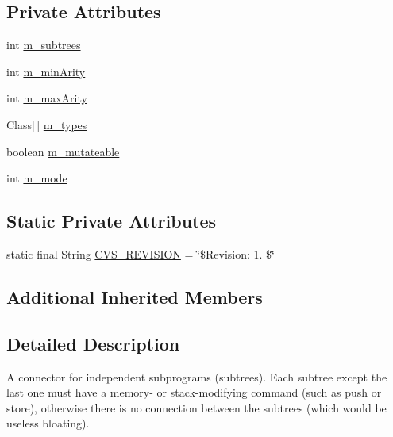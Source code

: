\subsection*{Private Attributes}
\begin{DoxyCompactItemize}
\item 
int \hyperlink{classorg_1_1jgap_1_1gp_1_1function_1_1_sub_program_a9593900f6e735a80870297491f38d5bf}{m\-\_\-subtrees}
\item 
int \hyperlink{classorg_1_1jgap_1_1gp_1_1function_1_1_sub_program_a414de40b13a4a090fc405e6ccf8a5d34}{m\-\_\-min\-Arity}
\item 
int \hyperlink{classorg_1_1jgap_1_1gp_1_1function_1_1_sub_program_a6751e1fc9048b69669880c52719c1312}{m\-\_\-max\-Arity}
\item 
Class\mbox{[}$\,$\mbox{]} \hyperlink{classorg_1_1jgap_1_1gp_1_1function_1_1_sub_program_af75004f996cfb4a825cc701c61047777}{m\-\_\-types}
\item 
boolean \hyperlink{classorg_1_1jgap_1_1gp_1_1function_1_1_sub_program_a9af15731317fff5d51db159ceea8bdb9}{m\-\_\-mutateable}
\item 
int \hyperlink{classorg_1_1jgap_1_1gp_1_1function_1_1_sub_program_ae91718b5521998e6467111bc33de873f}{m\-\_\-mode}
\end{DoxyCompactItemize}
\subsection*{Static Private Attributes}
\begin{DoxyCompactItemize}
\item 
static final String \hyperlink{classorg_1_1jgap_1_1gp_1_1function_1_1_sub_program_a7324753f18015392cd7c107e4e23ce98}{C\-V\-S\-\_\-\-R\-E\-V\-I\-S\-I\-O\-N} = \char`\"{}\$Revision\-: 1. \$\char`\"{}
\end{DoxyCompactItemize}
\subsection*{Additional Inherited Members}


\subsection{Detailed Description}
A connector for independent subprograms (subtrees). Each subtree except the last one must have a memory-\/ or stack-\/modifying command (such as push or store), otherwise there is no connection between the subtrees (which would be useless bloating).

